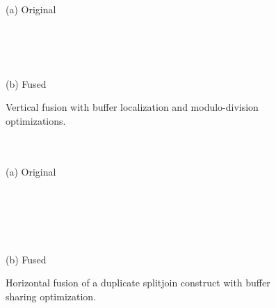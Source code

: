 \begin{figure}
\begin{center}
\begin{minipage}{1.22in}
\centering
{} \\ ~ \vspace{-6pt} \\
(a) Original~~~~~~~~
\end{minipage}
~
\begin{minipage}{1.97in}
\centering
{} \\ ~ \vspace{-6pt} \\
(b) Fused~~~~~~~~
\end{minipage}
\vspace{-6pt}
\caption{\protect\small Vertical fusion with buffer localization and
modulo-division optimizations. \label{fig:fuse-pipe}}
\end{center}
\vspace{12pt}
\begin{minipage}{2.25in}
\centering
{} \\ ~ \vspace{-6pt} \\
(a) Original~~~~
\end{minipage} \\

~~~~~~~~~~~~~~~~~~~~~~~~~~~~~~~~~~~~~~~~~~~\begin{minipage}{1.30in}
\centering
{} \\ ~ \vspace{-6pt} \\
(b) Fused~~~~
\end{minipage}
\caption{\protect\small Horizontal fusion of a duplicate splitjoin
construct with buffer sharing optimization. \protect\label{fig:fuse-splitjoin}}
\end{figure}

